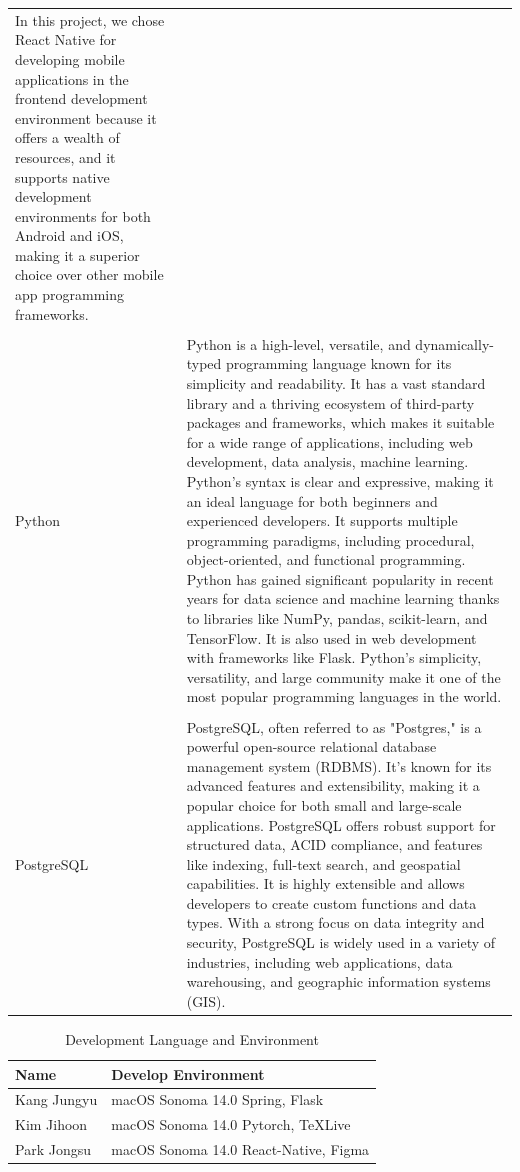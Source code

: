 \documentclass[conference]{IEEEtran}
\begin{document}
\begin{table}[htbp]
\begin{xtabular}{| p{1.2cm}|p{6.8cm} |}
            In this project, we chose React Native for developing mobile applications in the frontend development environment because it offers a wealth of resources, and it supports native development environments for both Android and iOS, making it a superior choice over other mobile app programming frameworks. \\  \\
             \hline
             Python & Python is a high-level, versatile, and dynamically-typed programming language known for its simplicity and readability. It has a vast standard library and a thriving ecosystem of third-party packages and frameworks, which makes it suitable for a wide range of applications, including web development, data analysis, machine learning. Python's syntax is clear and expressive, making it an ideal language for both beginners and experienced developers. It supports multiple programming paradigms, including procedural, object-oriented, and functional programming. Python has gained significant popularity in recent years for data science and machine learning thanks to libraries like NumPy, pandas, scikit-learn, and TensorFlow. It is also used in web development with frameworks like Flask. Python's simplicity, versatility, and large community make it one of the most popular programming languages in the world.\\\\
             \hline
             PostgreSQL &  PostgreSQL, often referred to as "Postgres," is a powerful open-source relational database management system (RDBMS). It's known for its advanced features and extensibility, making it a popular choice for both small and large-scale applications. PostgreSQL offers robust support for structured data, ACID compliance, and features like indexing, full-text search, and geospatial capabilities. It is highly extensible and allows developers to create custom functions and data types. With a strong focus on data integrity and security, PostgreSQL is widely used in a variety of industries, including web applications, data warehousing, and geographic information systems (GIS). \\ [1ex]
             \hline
        \end{xtabular}
    \end{table}
    
    \begin{table}[htbp]
        \caption{Development Language and Environment}
        \centering
        \begin{xtabular}{|p{2cm}|p{4cm}|}
        \hline
        Name & Develop Environment\\
        \hline
        Kang Jungyu & 
        macOS Sonoma 14.0 \hfill \break Spring, Flask\\
        \hline
        Kim Jihoon & 
        macOS Sonoma 14.0 \hfill \break Pytorch, TeXLive\\
        \hline
        Park Jongsu & 
        macOS Sonoma 14.0 \hfill \break React-Native, Figma\\
        \hline
        \end{xtabular}
    \end{table}
\end{document}

